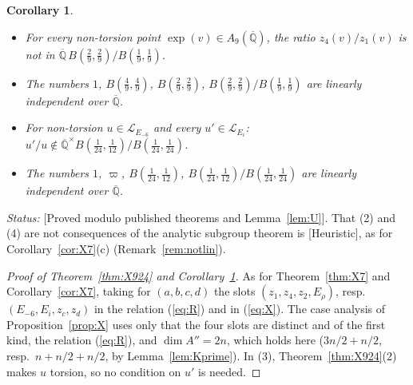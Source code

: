 \documentclass[11pt]{amsart}
\newtheorem{corollary}[theorem]{Corollary}
\theoremstyle{definition}
\newcommand{\Qb}{\overline{\mathbb{Q}}}
\newcommand{\Lg}{\mathcal{L}}
\newcommand{\vp}{\varpi}
\newcommand{\lab}[1]{\textup{[#1]}}
\newcommand{\LabC}{\lab{Proved modulo published theorems and Lemma~\ref{lem:U}}}
\newcommand{\Status}{\noindent\emph{Status:} }
\begin{document}
\begin{corollary}\label{cor:X924}
\begin{itemize}
\item[(1)] For every non-torsion point $\exp(v)\in A_9(\Qb)$, the ratio $z_4(v)/z_1(v)$ is not in
$\Qb\,B(\frac29,\frac29)/B(\frac19,\frac19)$.
\item[(2)] The numbers $1$, $B(\frac49,\frac49)$, $B(\frac29,\frac29)$, $B(\frac29,\frac29)/B(\frac19,\frac19)$ are linearly
independent over $\Qb$.
\item[(3)] For non-torsion $u\in\Lg_{E_{-6}}$ and every $u'\in\Lg_{E_i}$: $u'/u\notin\Qb^\times
B(\frac1{24},\frac1{12})/B(\frac1{24},\frac1{24})$.
\item[(4)] The numbers $1$, $\vp$, $B(\frac1{24},\frac1{12})$, $B(\frac1{24},\frac1{12})/B(\frac1{24},\frac1{24})$ are
linearly independent over $\Qb$.
\end{itemize}
\end{corollary}

\Status \LabC. That (2) and (4) are not consequences of the analytic subgroup theorem is \lab{Heuristic}, as for
Corollary~\ref{cor:X7}(c) (Remark~\ref{rem:notlin}).

\begin{proof}[Proof of Theorem~\ref{thm:X924} and Corollary~\ref{cor:X924}]
As for Theorem~\ref{thm:X7} and Corollary~\ref{cor:X7}, taking for $(a,b,c,d)$ the slots
$(z_1,z_4,z_2,E_\rho)$, resp.\
$(E_{-6},E_i,z_c,z_d)$ in the relation (\ref{eq:R}) and in (\ref{eq:X}). The case analysis of Proposition~\ref{prop:X} uses only that the four
slots are distinct and of the first kind, the relation (\ref{eq:R}), and $\dim A''=2n$, which holds here ($3n/2+n/2$, resp.\
$n+n/2+n/2$, by Lemma~\ref{lem:Kprime}). In (3), Theorem~\ref{thm:X924}(2) makes $u$ torsion, so no condition on $u'$ is
needed.
\end{proof}
\end{document}
